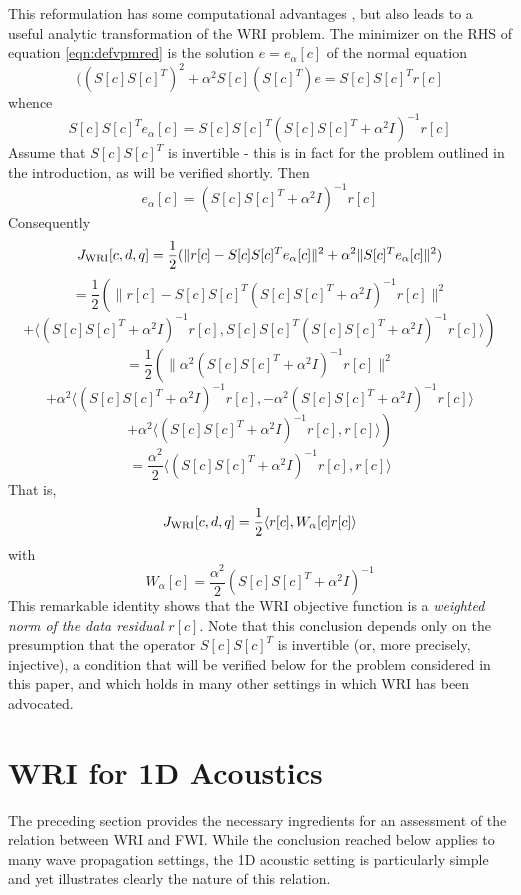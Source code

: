 This reformulation has some computational advantages \cite[]{WangYingst:SEG16,Herrmann:SEG19}, but also leads to a useful analytic transformation of the WRI problem. The minimizer on the RHS of equation \ref{eqn:defvpmred} is the solution $e=e_{\alpha}[c]$ of the normal equation
\[
 ( (S[c]S[c]^T)^2 + \alpha^2S[c](S[c]^T)e = S[c]S[c]^Tr[c]
\]
whence
\[
  S[c]S[c]^Te_{\alpha}[c] = S[c]S[c]^T(S[c]S[c]^T+\alpha^2I)^{-1}r[c]
\]
Assume that $S[c]S[c]^T$ is invertible - this is in fact for the problem outlined in the introduction, as will be verified shortly. Then
\begin{equation}
  \label{eqn:norsol}
  e_{\alpha}[c]=(S[c]S[c]^T+\alpha^2I)^{-1}r[c]
\end{equation}
Consequently
\[
  J_{\rm WRI}[c,d,q] =
  \frac{1}{2}(\|r[c]-S[c]S[c]^Te_{\alpha}[c]\|^2+\alpha^2\|S[c]^Te_{\alpha}[c]\|^2)
\]
\[
  = \frac{1}{2}\left(\|r[c]-S[c]S[c]^T
    (S[c]S[c]^T+\alpha^2I)^{-1}r[c]\|^2 \right.
\]
\[
  \left.+\langle (S[c]S[c]^T+\alpha^2I)^{-1}r[c],
  S[c]S[c]^T (S[c]S[c]^T+\alpha^2I)^{-1}r[c]
  \rangle\right)
\]
\[
  =\frac{1}{2}\left(\|\alpha^2 (S[c]S[c]^T+\alpha^2I)^{-1}r[c]\|^2\right.
\]
\[
  \left.
  +\alpha^2\langle (S[c]S[c]^T+\alpha^2I)^{-1}r[c],
  -\alpha^2 (S[c]S[c]^T+\alpha^2I)^{-1}r[c]\rangle\right.
\]
\[
  + \left.\alpha^2\langle (S[c]S[c]^T+\alpha^2I)^{-1}r[c],r[c]\rangle\right)
\]
\[
  =  \frac{\alpha^2}{2}
\langle (S[c]S[c]^T+\alpha^2I)^{-1}r[c],r[c]\rangle 
\]
That is,
\begin{equation}
  \label{eqn:defwrialt}
  J_{\rm WRI}[c,d,q] = \frac{1}{2}\langle r[c], W_{\alpha}[c] r[c]\rangle
\end{equation}
with
\begin{equation}
  \label{eqn:defwriwt}
  W_{\alpha}[c] = \frac{\alpha^2}{2}(S[c]S[c]^T+\alpha^2I)^{-1}
\end{equation}
This remarkable identity shows that the WRI objective function is a {\em weighted norm of the data residual $r[c]$}. Note that this conclusion depends only on the presumption that the operator $S[c]S[c]^T$ is invertible (or, more precisely, injective), a condition that will be verified below for the problem considered in this paper, and which holds in many other settings in which WRI has been advocated.

\section{WRI for 1D Acoustics}
The preceding section provides the necessary ingredients for an assessment of the relation between WRI and FWI. While the conclusion reached below applies to many wave propagation settings, the 1D acoustic setting is particularly simple and yet illustrates clearly the nature of this relation.

